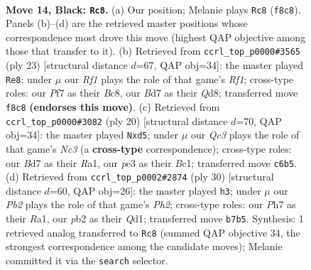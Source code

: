 \documentclass[11pt]{article}
\begin{document}
\clearpage

\begin{figure}[p]\centering
\begin{subfigure}{0.46\textwidth}\centering
\resizebox{\linewidth}{!}{%
\newchessgame
\chessboard[
  setfen={rn3rk1/1p1b1ppp/p1qbpn2/8/8/3BPN2/PP1BNPPP/R2Q1RK1 b - - 9 14},
  showmover=false,
  pgfstyle=straightmove, color=movearrow, markmove={f8-c8}
]}
\caption{}
\end{subfigure}\hfill
\begin{subfigure}{0.46\textwidth}\centering
\resizebox{\linewidth}{!}{%
\newchessgame
\chessboard[
  setfen={r1bq1rk1/1p3ppp/1bn2n2/p2p4/3N1B2/2PB1N2/PP3PPP/R2Q1RK1 b - - 3 12},
  showmover=false,
  pgfstyle=straightmove, color=movearrow, markmove={f8-e8}
]}
\caption{}
\end{subfigure}
\\[4pt]
\begin{subfigure}{0.46\textwidth}\centering
\resizebox{\linewidth}{!}{%
\newchessgame
\chessboard[
  setfen={r1bq1rk1/pp2nppp/3bp3/3n4/3P4/1BN2N2/PP3PPP/R1BQ1RK1 w - - 1 11},
  showmover=false,
  pgfstyle=straightmove, color=movearrow, markmove={c3-d5}
]}
\caption{}
\end{subfigure}\hfill
\begin{subfigure}{0.46\textwidth}\centering
\resizebox{\linewidth}{!}{%
\newchessgame
\chessboard[
  setfen={r1bq1rk1/5ppp/p1nb1n2/3p4/2pP1B2/P1N1P3/2B1NPPP/R2Q1RK1 w - - 2 16},
  showmover=false,
  pgfstyle=straightmove, color=movearrow, markmove={h2-h3}
]}
\caption{}
\end{subfigure}
\caption{\textbf{Move 14, Black: \texttt{Rc8}.} (a) Our position; Melanie plays \texttt{Rc8} (\texttt{f8c8}). Panels (b)--(d) are the retrieved master positions whose correspondence most drove this move (highest QAP objective among those that transfer to it). (b) Retrieved from \texttt{ccrl\_top\_p0000\#3565} (ply 23) [structural distance $d$=67, QAP obj=34]: the master played \texttt{Re8}; under $\mu$ our \emph{Rf1} plays the role of that game's \emph{Rf1}; cross-type roles: our \emph{P}f7 as their \emph{B}c8, our \emph{B}d7 as their \emph{Q}d8; transferred move \texttt{f8c8} \textbf{(endorses this move)}. (c) Retrieved from \texttt{ccrl\_top\_p0000\#3082} (ply 20) [structural distance $d$=70, QAP obj=34]: the master played \texttt{Nxd5}; under $\mu$ our \emph{Qc3} plays the role of that game's \emph{Nc3} (a \textbf{cross-type} correspondence); cross-type roles: our \emph{B}d7 as their \emph{R}a1, our \emph{p}e3 as their \emph{B}c1; transferred move \texttt{c6b5}. (d) Retrieved from \texttt{ccrl\_top\_p0002\#2874} (ply 30) [structural distance $d$=60, QAP obj=26]: the master played \texttt{h3}; under $\mu$ our \emph{Pb2} plays the role of that game's \emph{Ph2}; cross-type roles: our \emph{P}h7 as their \emph{R}a1, our \emph{p}b2 as their \emph{Q}d1; transferred move \texttt{b7b5}. Synthesis: 1 retrieved analog transferred to \texttt{Rc8} (summed QAP objective 34, the strongest correspondence among the candidate moves); Melanie committed it via the \texttt{search} selector.}
\label{fig:thought-m27}
\end{figure}
\end{document}
